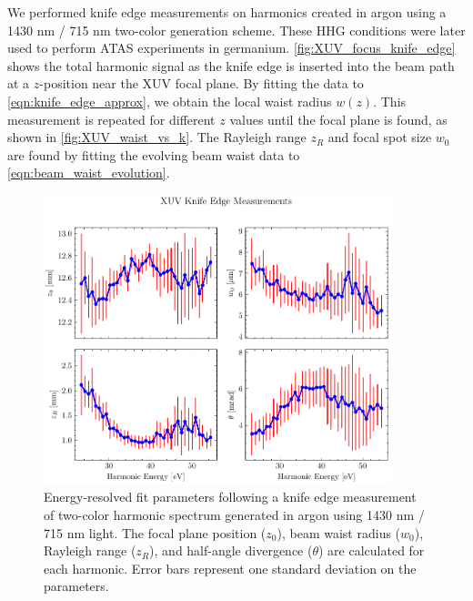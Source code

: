 We performed knife edge measurements on harmonics created in argon using a 1430 nm / 715 nm two-color generation scheme. These HHG conditions were later used to perform ATAS experiments in germanium. \cref{fig:XUV_focus_knife_edge} shows the total harmonic signal as the knife edge is inserted into the beam path at a $z$-position near the XUV focal plane. By fitting the data to \cref{eqn:knife_edge_approx}, we obtain the local waist radius $w(z)$. This measurement is repeated for different $z$ values until the focal plane is found, as shown in \cref{fig:XUV_waist_vs_k}. The Rayleigh range $z_R$ and focal spot size $w_0$ are found by fitting the evolving beam waist data to \cref{eqn:beam_waist_evolution}.


\begin{figure}
	\centering
	\includegraphics[width=0.9\textwidth]{figures/chap3/knife_edge_fit_2x2.pdf}
	\caption{Energy-resolved fit parameters following a knife edge measurement of two-color harmonic spectrum generated in argon using 1430 nm / 715 nm light. The focal plane position ($z_0$), beam waist radius ($w_0$), Rayleigh range ($z_R$), and half-angle divergence ($\theta$) are calculated for each harmonic. Error bars represent one standard deviation on the parameters.}
	\label{fig:knife_edge_fit_2x2}
\end{figure}

